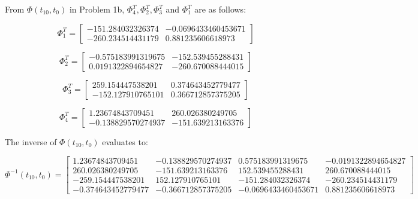 \documentclass[conf]{new-aiaa}
\begin{document}
From $\Phi( t_{10}, t_0 )$ in Problem 1b, $\Phi^T_4, \Phi^T_2, \Phi^T_3$ and $\Phi^T_1$ are as follows: 

\begin{equation}
	\Phi^T_1 = 
	\begin{bmatrix}		
		-151.284032326374   &    -0.0696433460453671    \\
		-260.234514431179    &     0.881235606618973    
	\end{bmatrix}
\end{equation}

\begin{equation}
	\Phi^T_2 = 
	\begin{bmatrix}
		-0.575183991319675   &      -152.539455288431 \\
	 	0.0191322894654827    &     -260.670088444015 
	\end{bmatrix}
\end{equation}

\begin{equation}
	\Phi^T_3 = 
	\begin{bmatrix}
		259.154447538201     &    0.374643452779477      \\
		-152.127910765101    &     0.366712857375205    
	\end{bmatrix}
\end{equation}

\begin{equation}
	\Phi^T_4 = 
	\begin{bmatrix}
		1.23674843709451     &     260.026380249705 \\
		-0.138829570274937    &     -151.639213163376
	\end{bmatrix}
\end{equation}

The inverse of $\Phi( t_{10}, t_0 )$ evaluates to: 

\begin{equation}
	\Phi^{-1}(t_{10}, t_0) = 
	\begin{bmatrix}
		1.23674843709451    &    -0.138829570274937     &    0.575183991319675    &   -0.0191322894654827 \\
		260.026380249705    &     -151.639213163376     &     152.539455288431    &      260.670088444015 \\
		-259.154447538201   &       152.127910765101    &     -151.284032326374   &      -260.234514431179 \\
		-0.374643452779477  &      -0.366712857375205   &    -0.0696433460453671  &       0.881235606618973
	\end{bmatrix}
\end{equation}
\end{document}
